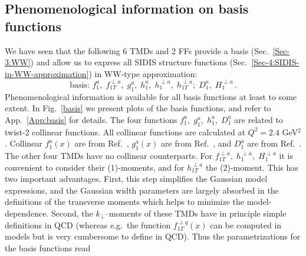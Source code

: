 \documentclass[a4paper,11pt]{article}
\newcommand{\blue}[1]{{\color{blue} #1}}
\newcommand{\be}{\begin{equation}}
\newcommand{\ee}{\end{equation}}
\newcommand{\ps}[1]{\blue{ #1}}
\begin{document}
\subsection{Phenomenological information on basis functions}
\label{Sec-4.3:plot-basis-functions}

We have seen that the following 6 TMDs and 2 FFs provide a basis 
(Sec.~\ref{Sec-3:WW}) and allow us to express all SIDIS structure 
functions (Sec.~\ref{Sec-4:SIDIS-in-WW-approximation})  
in WW-type approximation: 
\be\label{Eq:basis}
   \mbox{basis: \ \ } 
   f_1^a, \; f_{1T}^{\perp a}, \; g_1^a, \; h_1^a, \;h_1^{\perp a},\; h_{1T}^{\perp a};
   \; D_1^a, \; H_1^{\perp a} \, .
\ee
Phenomenological information is available for all basis functions at 
least to some extent. 
In Fig.~\ref{basis} we present plots of the basis functions, and refer
to App.~\ref{App:basis} for details.
The four functions $f_1^a, \; g_1^a, \; h_1^a,\; D_1^a$  are related to 
twist-2 collinear functions. All collinear functions are calculated at 
$Q^2 = 2.4$ GeV$^2$. Collinear $f_1^a(x)$ are from Ref.~\cite{Martin:2009iq},  
$g_1^a(x)$ are from Ref.~\cite{Gluck:1998xa}, and $D_1^a$ are from 
Ref.~\cite{deFlorian:2007aj}. The other four TMDs 
\ps{have no collinear counterparts. 
For $f_{1T}^{\perp a},\;h_1^{\perp a},\;H_1^{\perp a}$ it is convenient to 
consider their (1)-moments, and for $ h_{1T}^{\perp a}$  the (2)-moment.
This has two important advantages. First, this step simplifies 
the Gaussian model expressions, and the Gaussian width parameters are
largely absorbed in the definitions of the transverse moments which 
helps to minimize the model-dependence. Second,
the $k_\perp$--moments of these TMDs have in principle simple definitions
in QCD (whereas e.g.\ the function $f_{1T}^{\perp q}(x)$ can be computed in
models but is very cumbersome to define in QCD).
Thus the parametrizations for the basis functions read}
\end{document}

